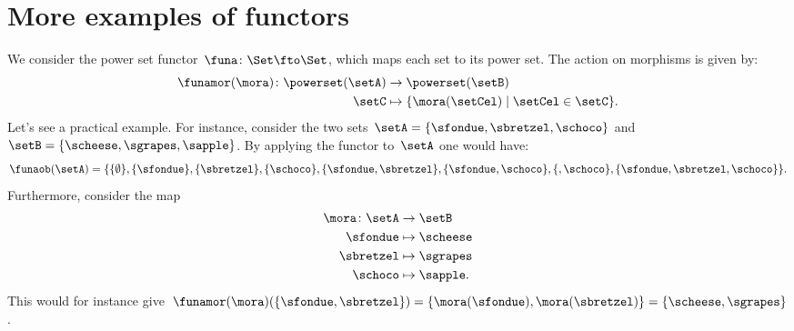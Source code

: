 
\section{More examples of functors}

\begin{example}
	\label{ex:powerset_functor}
	We consider the power set functor~$\funa\colon \Set \fto \Set$, which maps each set to its power set.
	The action on morphisms is given by:
	\begin{equation*}
		\begin{aligned}
			\funamor(\mora)\colon \powerset(\setA) & \to \powerset(\setB)                               \\
			\setC                                  & \mapsto \{\mora(\setCel) \mid \setCel \in \setC\}.
		\end{aligned}
	\end{equation*}
	Let's see a practical example.
	For instance, consider the two sets~$\setA=\{\sfondue,\sbretzel,\schoco\}$ and~$\setB=\{\scheese,\sgrapes,\sapple\}$.
	By applying the functor to~$\setA$ one would have:
	\begin{equation*}
		\funaob(\setA)=\{\{\emptyset\}, \{\sfondue\}, \{\sbretzel\}, \{\schoco\}, \{\sfondue,\sbretzel\}, \{\sfondue,\schoco\}, \{,\schoco\}, \{\sfondue,\sbretzel,\schoco\}\}.
	\end{equation*}
	Furthermore, consider the map
	\begin{equation*}
		\begin{aligned}
			\mora \colon \setA & \to \setB        \\
			\sfondue           & \mapsto \scheese \\
			\sbretzel          & \mapsto \sgrapes \\
			\schoco            & \mapsto \sapple.
		\end{aligned}
	\end{equation*}
	This would for instance give~$\funamor(\mora)(\{\sfondue,\sbretzel\})=\{\mora(\sfondue),\mora(\sbretzel)\}=\{\scheese,\sgrapes\}$.


\end{example}
